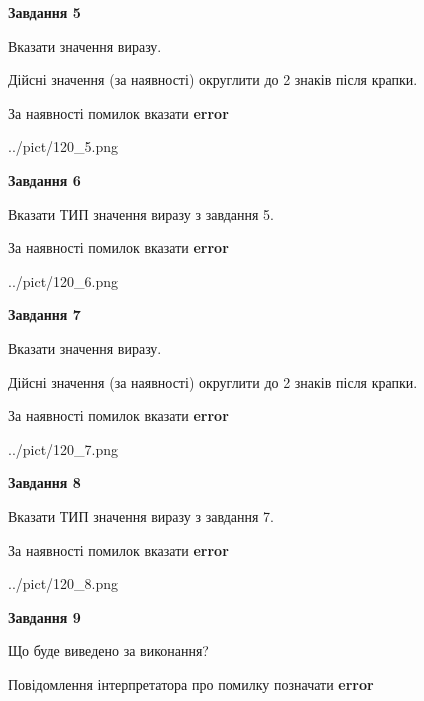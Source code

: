 \documentclass[11pt, ukrainian]{article}
\begin{document}
{\begin {large}
{\begin {center}\textbf{Завдання 5}\end {center}}\par
Вказати значення виразу. \par
Дійсні значення (за наявності) округлити до 2 знаків після крапки. \par
За наявності помилок вказати \textbf{error}

\begin{center}
	{../pict/120_5.png}
\end{center}
\newpage

{\begin {center}\textbf{Завдання 6}\end {center}}\par
Вказати ТИП значення виразу з завдання 5. \par
За наявності помилок вказати \textbf{error}

\begin{center}
	{../pict/120_6.png}
\end{center}
\newpage

{\begin {center}\textbf{Завдання 7}\end {center}}\par
Вказати значення виразу. \par
Дійсні значення (за наявності) округлити до 2 знаків після крапки. \par
За наявності помилок вказати \textbf{error}

\begin{center}
	{../pict/120_7.png}
\end{center}
\newpage

{\begin {center}\textbf{Завдання 8}\end {center}}\par
Вказати ТИП значення виразу з завдання 7. \par
За наявності помилок вказати \textbf{error}

\begin{center}
	{../pict/120_8.png}
\end{center}
\newpage

{\begin {center}\textbf{Завдання 9}\end {center}}\par
Що буде виведено за виконання? \par
Повідомлення інтерпретатора про помилку позначати \textbf{error}


\end{large}}
\end{document}
